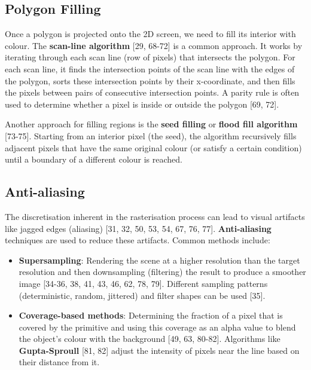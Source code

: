 \documentclass[12pt]{article}
\begin{document}
\subsection{Polygon Filling}

Once a polygon is projected onto the 2D screen, we need to fill its interior with colour. The \textbf{scan-line algorithm} [29, 68-72] is a common approach. It works by iterating through each scan line (row of pixels) that intersects the polygon. For each scan line, it finds the intersection points of the scan line with the edges of the polygon, sorts these intersection points by their x-coordinate, and then fills the pixels between pairs of consecutive intersection points. A parity rule is often used to determine whether a pixel is inside or outside the polygon [69, 72].

Another approach for filling regions is the \textbf{seed filling} or \textbf{flood fill algorithm} [73-75]. Starting from an interior pixel (the seed), the algorithm recursively fills adjacent pixels that have the same original colour (or satisfy a certain condition) until a boundary of a different colour is reached.

\subsection{Anti-aliasing}

The discretisation inherent in the rasterisation process can lead to visual artifacts like jagged edges (aliasing) [31, 32, 50, 53, 54, 67, 76, 77]. \textbf{Anti-aliasing} techniques are used to reduce these artifacts. Common methods include:

\begin{itemize}
    \item \textbf{Supersampling}: Rendering the scene at a higher resolution than the target resolution and then downsampling (filtering) the result to produce a smoother image [34-36, 38, 41, 43, 46, 62, 78, 79]. Different sampling patterns (deterministic, random, jittered) and filter shapes can be used [35].
    \item \textbf{Coverage-based methods}: Determining the fraction of a pixel that is covered by the primitive and using this coverage as an alpha value to blend the object's colour with the background [49, 63, 80-82]. Algorithms like \textbf{Gupta-Sproull} [81, 82] adjust the intensity of pixels near the line based on their distance from it.
\end{itemize}
\end{document}

